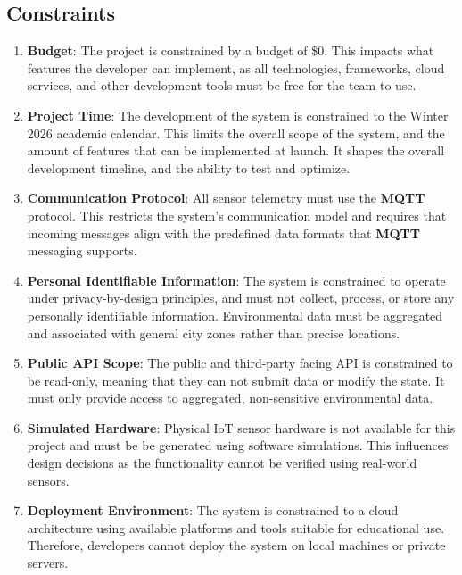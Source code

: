 \documentclass[]{article}
\begin{document}
\subsection{Constraints}
\label{sub:constraints}

\begin{enumerate}
    \item \textbf{Budget}: The project is constrained by a budget of \$0. This impacts what features the developer can implement, as all technologies, frameworks, cloud services, and other development tools must be free for the team to use.
    \item \textbf{Project Time}: The development of the system is constrained to the Winter 2026 academic calendar. This limits the overall scope of the system, and the amount of features that can be implemented at launch. It shapes the overall development timeline, and the ability to test and optimize. 
    \item \textbf{Communication Protocol}: All sensor telemetry must use the \textbf{MQTT} protocol. This restricts the system's communication model and requires that incoming messages align with the predefined data formats that \textbf{MQTT} messaging supports.
    \item \textbf{Personal Identifiable Information}: The system is constrained to operate under privacy-by-design principles, and must not collect, process, or store any personally identifiable information. Environmental data must be aggregated and associated with general city zones rather than precise locations.
    \item \textbf{Public API Scope}: The public and third-party facing API is constrained to be read-only, meaning that they can not submit data or modify the state. It must only provide access to aggregated, non-sensitive environmental data.
    \item \textbf{Simulated Hardware}: Physical IoT sensor hardware is not available for this project and must be be generated using software simulations. This influences design decisions as the functionality cannot be verified using real-world sensors.
    \item \textbf{Deployment Environment}: The system is constrained to a cloud architecture using available platforms and tools suitable for educational use. Therefore, developers cannot deploy the system on local machines or private servers.
\end{enumerate}
\end{document}
